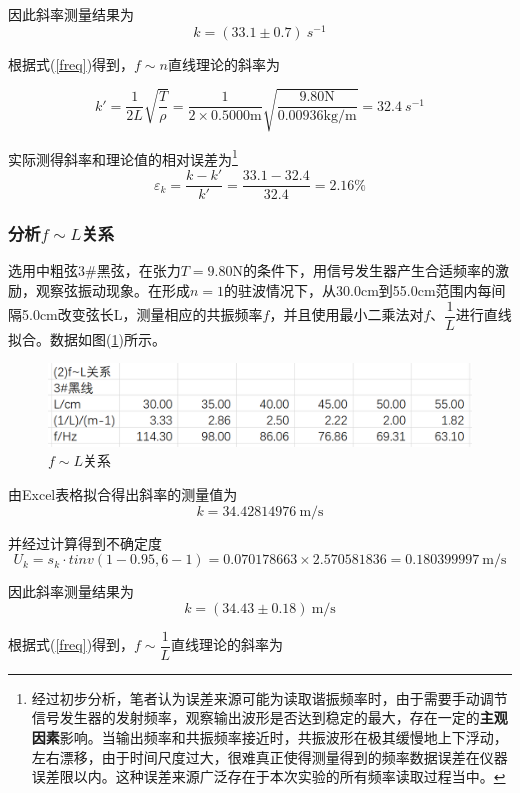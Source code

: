 \documentclass[a4paper,11pt]{article}
\begin{document}
                因此斜率测量结果为$$k = (33.1 \pm 0.7)~s^{-1}$$

                根据式(\ref{freq})得到，$f\sim n$直线理论的斜率为

                $$k' = \dfrac{1}{2L}\sqrt{\dfrac{T}{\rho}} = \dfrac{1}{2\times 0.5000\text{m}}\sqrt{\dfrac{\text{9.80N}}{\text{0.00936kg/m}}} = 32.4~s^{-1}$$

                实际测得斜率和理论值的相对误差为\footnote{经过初步分析，笔者认为误差来源可能为读取谐振频率时，由于需要手动调节信号发生器的发射频率，观察输出波形是否达到稳定的最大，存在一定的\textbf{主观因素}影响。当输出频率和共振频率接近时，共振波形在极其缓慢地上下浮动，左右漂移，由于时间尺度过大，很难真正使得测量得到的频率数据误差在仪器误差限以内。这种误差来源广泛存在于本次实验的所有频率读取过程当中。}$$\varepsilon_k = \dfrac{k-k'}{k'} = \dfrac{33.1-32.4}{32.4} = 2.16\%$$

            \subsubsection{分析$f\sim L$关系}

                选用中粗弦3\#黑弦，在张力$T=9.80$N的条件下，用信号发生器产生合适频率的激励，观察弦振动现象。在形成$n=1$的驻波情况下，从30.0cm到55.0cm范围内每间隔5.0cm改变弦长L，测量相应的共振频率$f$，并且使用最小二乘法对$f$、$\dfrac 1L$进行直线拟合。数据如图(\ref{data2})所示。

                \begin{figure}[ht]
                    \centering
                    \includegraphics[scale=0.7]{2.f~L关系.png}
                    \caption{$f\sim L$关系}
                    \label{data2}
                \end{figure}

                由Excel表格拟合得出斜率的测量值为$$k=34.42814976~\text{m/s}$$

                并经过计算得到不确定度$$U_k = s_k \cdot tinv(1-0.95, 6-1) = 0.070178663 \times 2.570581836 = 0.180399997~\text{m/s}$$

                因此斜率测量结果为$$k = (34.43 \pm 0.18)~\text{m/s}$$

                根据式(\ref{freq})得到，$f\sim \dfrac 1L$直线理论的斜率为
\end{document}
